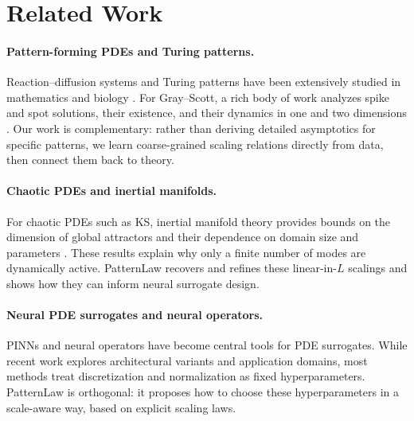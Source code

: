\documentclass{article}
\theoremstyle{plain}
\theoremstyle{definition}
\theoremstyle{remark}
\begin{document}
\section{Related Work}

\paragraph{Pattern-forming PDEs and Turing patterns.}
Reaction--diffusion systems and Turing patterns have been extensively studied in mathematics and biology \citep{Cross1993Pattern,Koch1994BiologicalPattern,Murray2003MathBioII,Maini2004PatternBiology}. For Gray--Scott, a rich body of work analyzes spike and spot solutions, their existence, and their dynamics in one and two dimensions \citep{Gray1983Autocatalytic,Gray1984Oscillations,Pearson1993Complex,McGough2004PatternGS,Doelman1997Localized,Kolokolnikov2005Spike1D,Sun2005TwoSpike,Chen2011GS2DSpots,Ward2006AsymptoticRD,Gandy2022GrayScottXPPAUT,Ali2023GrayScottTuring,Cadiot2024GS2DConstructive,Hao2024VariationalGrayScott}. Our work is complementary: rather than deriving detailed asymptotics for specific patterns, we learn coarse-grained scaling relations directly from data, then connect them back to theory.

\paragraph{Chaotic PDEs and inertial manifolds.}
For chaotic PDEs such as KS, inertial manifold theory provides bounds on the dimension of global attractors and their dependence on domain size and parameters \citep{Jolly2000InertialKS,WittenbergHolmes1999KSScale}. These results explain why only a finite number of modes are dynamically active. PatternLaw recovers and refines these linear-in-$L$ scalings and shows how they can inform neural surrogate design.

\paragraph{Neural PDE surrogates and neural operators.}
PINNs \citep{Sirignano2018DGM,Raissi2019PINN,Cai2021PINNFluidReview} and neural operators \citep{Li2021FNO,Kovachki2021NeuralOperator,Lu2021DeepONet,Tripura2022WaveletNO,Cao2024LaplaceNO,Xiong2024KoopmanNO} have become central tools for PDE surrogates. While recent work explores architectural variants and application domains, most methods treat discretization and normalization as fixed hyperparameters. PatternLaw is orthogonal: it proposes how to choose these hyperparameters in a scale-aware way, based on explicit scaling laws.
\end{document}
